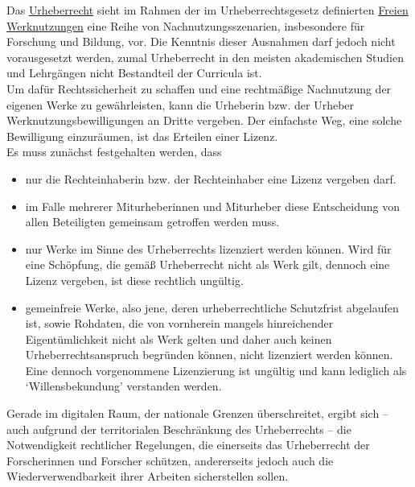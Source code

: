 \documentclass{article}
\begin{document}
    Das \href{http://gams.uni-graz.at/o:konde.44}{Urheberrecht} sieht im Rahmen
                  der im Urheberrechtsgesetz definierten \href{http://gams.uni-graz.at/o:konde.222}{Freien Werknutzungen}
                  eine Reihe von Nachnutzungsszenarien, insbesondere für Forschung und
                  Bildung, vor. Die Kenntnis dieser Ausnahmen darf jedoch nicht vorausgesetzt
                  werden, zumal Urheberrecht in den meisten akademischen Studien und Lehrgängen
                  nicht Bestandteil der Curricula ist. \\
            
        Um dafür Rechtssicherheit zu schaffen und eine rechtmäßige Nachnutzung der eigenen
                  Werke zu gewährleisten, kann die Urheberin bzw. der Urheber
                  Werknutzungsbewilligungen an Dritte vergeben. Der einfachste Weg, eine solche
                  Bewilligung einzuräumen, ist das Erteilen einer Lizenz. \\
            
        Es muss zunächst festgehalten werden, dass \\
            
        \begin{itemize}\item {nur die Rechteinhaberin bzw. der Rechteinhaber eine Lizenz vergeben darf. }\item {im Falle mehrerer Miturheberinnen und Miturheber diese Entscheidung von
                     allen Beteiligten gemeinsam getroffen werden muss. }\item {nur Werke im Sinne des Urheberrechts lizenziert werden können. Wird für eine
                     Schöpfung, die gemäß Urheberrecht nicht als Werk gilt, dennoch eine Lizenz
                     vergeben, ist diese rechtlich ungültig. }\item {gemeinfreie Werke, also jene, deren urheberrechtliche Schutzfrist abgelaufen
                     ist, sowie Rohdaten, die von vornherein mangels hinreichender Eigentümlichkeit
                     nicht als Werk gelten und daher auch keinen Urheberrechtsanspruch begründen
                     können, nicht lizenziert werden können. Eine dennoch vorgenommene Lizenzierung
                     ist ungültig und kann lediglich als ‘Willensbekundung’ verstanden werden.
                  }\end{itemize}Gerade im digitalen Raum, der nationale Grenzen überschreitet, ergibt sich – auch
                  aufgrund der territorialen Beschränkung des Urheberrechts – die Notwendigkeit
                  rechtlicher Regelungen, die einerseits das Urheberrecht der Forscherinnen und
                  Forscher schützen, andererseits jedoch auch die Wiederverwendbarkeit ihrer
                  Arbeiten sicherstellen sollen.\\
            
\end{document}
